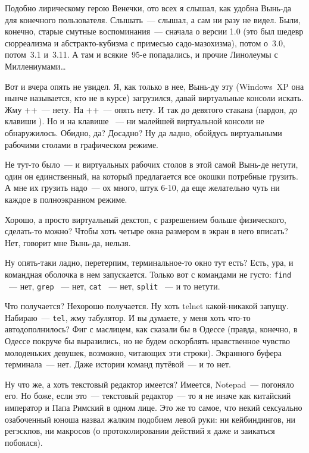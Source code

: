 Подобно лирическому герою Венечки, ото всех я слышал, как удобна Вынь-да для конечного пользователя. Слышать~--- слышал, а сам ни разу не видел. Были, конечно, старые смутные воспоминания~--- сначала о версии 1.0 (это был шедевр сюрреализма и абстракто-кубизма с примесью садо-мазохизма), потом о~3.0, потом~3.1 и~3.11. А там и всякие~95-е попадались, и прочие Линолеумы с Миллениумами\dots

Вот и вчера опять не увидел. Я, как только в нее, Вынь-ду эту (Windows~XP она нынче называется, кто не в курсе) загрузился, давай виртуальные консоли искать. Жму ++~--- нету. На ++~--- опять нету. И так до девятого стакана (пардон, до клавиши ). Но и на клавише ~--- ни малейшей виртуальной консоли не обнаружилось. Обидно, да? Досадно? Ну да ладно, обойдусь виртуальными рабочими столами в графическом режиме.

Не тут-то было~--- и виртуальных рабочих столов в этой самой Вынь-де нетути, один он единственный, на который предлагается все окошки потребные грузить. А мне их грузить надо~--- ох много, штук 6-10, да еще желательно чуть ни каждое в полноэкранном режиме.

Хорошо, а просто виртуальный декстоп, с разрешением больше физического, сделать-то можно? Чтобы хоть четыре окна размером в экран в него вписать? Нет, говорит мне Вынь-да, нельзя.

Ну опять-таки ладно, перетерпим, терминальное-то окно тут есть? Есть, ура, и командная оболочка в нем запускается. Только вот с командами не густо: 
\texttt{find} ~--- нет, 
\texttt{grep} ~--- нет, 
\texttt{cat} ~--- нет, 
\texttt{split} ~--- и то нетути. 

Что получается? Нехорошо получается. Ну хоть telnet какой-никакой запущу. Набираю~--- \texttt{tel}, жму табулятор. И вы думаете, у меня хоть что-то автодополнилось? Фиг с маслицем, как сказали бы в Одессе (правда, конечно, в Одессе покруче бы выразились, но не будем оскорблять нравственное чувство молоденьких девушек, возможно, читающих эти строки). Экранного буфера терминала~--- нет. Даже истории команд путёвой~--- и то нет.

Ну что же, а хоть текстовый редактор имеется? Имеется, Notepad~--- погоняло его. Но боже, если это~--- текстовый редактор~--- то я не иначе как китайский император и Папа Римский в одном лице. Это же то самое, что некий сексуально озабоченный юноша назвал жалким подобием левой руки: ни кейбиндингов, ни регэскпов, ни макросов (о протоколировании действий я даже и заикаться побоялся).

